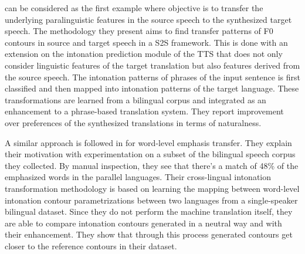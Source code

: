 \cite{aguero2006prosody} can be considered as the first example where objective is to transfer the underlying paralinguistic features in the source speech to the synthesized target speech. The methodology they present aims to find transfer patterns of F0 contours in source and target speech in a S2S framework. This is done with an extension on the intonation prediction module of the TTS that does not only consider linguistic features of the target translation but also features derived from the source speech. The intonation patterns of phrases of the input sentence is first classified and then mapped into intonation patterns of the target language. These transformations are learned from a bilingual corpus and integrated as an enhancement to a phrase-based translation system. They report improvement over preferences of the synthesized translations in terms of naturalness. 

A similar approach is followed in \cite{anumanchipalli:2012} for word-level emphasis transfer. They explain their motivation with experimentation on a subset of the bilingual speech corpus they collected. By manual inspection, they see that there's a match of 48\% of the emphasized words in the parallel languages. Their cross-lingual intonation transformation methodology is based on learning the mapping between word-level intonation contour parametrizations between two languages from a single-speaker bilingual dataset. Since they do not perform the machine translation itself, they are able to compare intonation contours generated in a neutral way and with their enhancement. They show that through this process generated contours get closer to the reference contours in their dataset.



